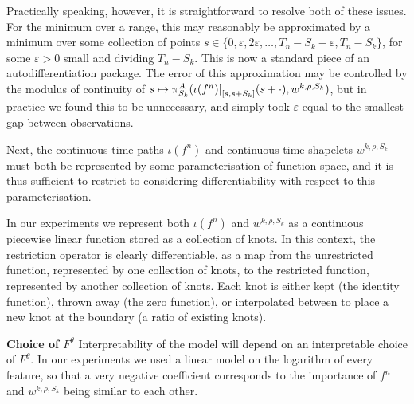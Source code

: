 \documentclass{article}
\theoremstyle{plain}
\theoremstyle{definition}
\newcommand{\reals}{\mathbb{R}}
\newcommand{\restr}[2]{{\left.\kern-\nulldelimiterspace #1 \right|_{#2}}}
\newcommand{\boldheading}[1]{

\textbf{#1}\quad}
\begin{document}
	Practically speaking, however, it is straightforward to resolve both of these issues. For the minimum over a range, this may reasonably be approximated by a minimum over some collection of points $s \in \{0, \varepsilon, 2 \varepsilon, \ldots, T_n - S_k - \varepsilon, T_n - S_k\}$, for some $\varepsilon > 0$ small and dividing $T_n - S_k$. This is now a standard piece of an autodifferentiation package. The error of this approximation may be controlled by the modulus of continuity of $s \mapsto \pi^A_{S_k}(\restr{\iota(f^n)}{[s, s + S_k]}(s + \cdot), w^{k, \rho, S_k})$, but in practice we found this to be unnecessary, and simply took $\varepsilon$ equal to the smallest gap between observations.
	
	Next, the continuous-time paths $\iota(f^n)$ and continuous-time shapelets $w^{k, \rho, S_k}$ must both be represented by some parameterisation of function space, and it is thus sufficient to restrict to considering differentiability with respect to this parameterisation.
	
	In our experiments we represent both $\iota(f^n)$ and $w^{k, \rho, S_k}$ as a continuous piecewise linear function stored as a collection of knots. In this context, the restriction operator is clearly differentiable, as a map from the unrestricted function, represented by one collection of knots, to the restricted function, represented by another collection of knots. Each knot is either kept (the identity function), thrown away (the zero function), or interpolated between to place a new knot at the boundary (a ratio of existing knots).

	
	\boldheading{Choice of $F^\theta$}\label{section:choice-of-f}
	Interpretability of the model will depend on an interpretable choice of $F^\theta$. In our experiments we used a linear model on the logarithm of every feature, so that a very negative coefficient corresponds to the importance of $f^n$ and $w^{k, \rho, S_k}$ being similar to each other.
	
\end{document}
